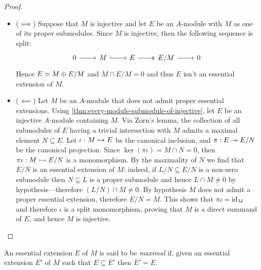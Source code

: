 \begin{proof}
    \begin{itemize}\setlength\itemsep{0em}
        \item (\(\implies\)) Suppose that \(M\) is injective and let \(E\) be an
              \(A\)-module with \(M\) as one of its proper submodules. Since \(M\) is
              injective, then the following sequence is split:
              \[
                  \begin{tikzcd}
                      0 \ar[r] &M \ar[r, hook] &E \ar[r, two heads] &E/M \ar[r] &0
                  \end{tikzcd}
              \]
              Hence \(E \simeq M \oplus E/M\) and \(M \cap E/M = 0\) and thus \(E\) isn't an essential
              extension of \(M\).

        \item (\(\impliedby\)) Let \(M\) be an \(A\)-module that does not admit proper
              essential extensions. Using \cref{thm:every-module-submodule-of-injective},
              let \(E\) be an injective \(A\)-module containing \(M\). Via Zorn's lemma, the
              collection of all submodules of \(E\) having a trivial intersection with \(M\)
              admits a maximal element \(N \subseteq E\). Let \(\iota: M \hookrightarrow E\) be the canonical
              inclusion, and \(\pi: E \twoheadrightarrow E/N\) be the canonical projection. Since \(\ker(\pi
              \iota) = M \cap N = 0\), then \(\pi \iota: M \rightarrowtail E/N\) is a monomorphism. By the
              maximality of \(N\) we find that \(E/N\) is an essential extension of \(M\):
              indeed, if \(L/N \subseteq E/N\) is a non-zero submodule then \(N \subsetneq L\) is a proper
              submodule and hence \(L \cap M \neq 0\) by hypothesis---therefore \((L/N) \cap M \neq
              0\). By hypothesis \(M\) does not admit a proper essential extension,
              therefore \(E/N = M\). This shows that \(\pi \iota = \operatorname{id}_M\) and therefore \(\iota\) is
              a split monomorphism, proving that \(M\) is a direct summand of \(E\), and
              hence \(M\) is injective.
    \end{itemize}
\end{proof}

\begin{definition}
    \label{def:maximal-essential-extension}
    An essential extension \(E\) of \(M\) is said to be \emph{maximal} if, given an
    essential extension \(E'\) of \(M\) such that \(E \subseteq E'\) then \(E' = E\).
\end{definition}

